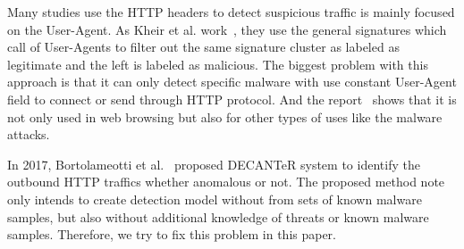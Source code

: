 Many studies use the HTTP headers to detect suspicious traffic is mainly focused on the User-Agent. As Kheir et al. work~\cite{kheir2013behavioral}, they use the general signatures which call of User-Agents to filter out the same signature cluster as labeled as legitimate and the left is labeled as malicious. The biggest problem with this approach is that it can only detect specific malware with use constant User-Agent field to connect or send through HTTP protocol. And the report~\cite{bartos2016optimized} shows that it is not only used in web browsing but also for other types of uses like the malware attacks.

In 2017, Bortolameotti et al.~\cite{bortolameotti2017decanter} proposed DECANTeR system to identify the outbound HTTP traffics whether anomalous or not.   The proposed method note only intends to create detection model without from sets of known malware samples, but also without additional knowledge of threats or known malware samples. Therefore, we try to fix this problem in this paper. 